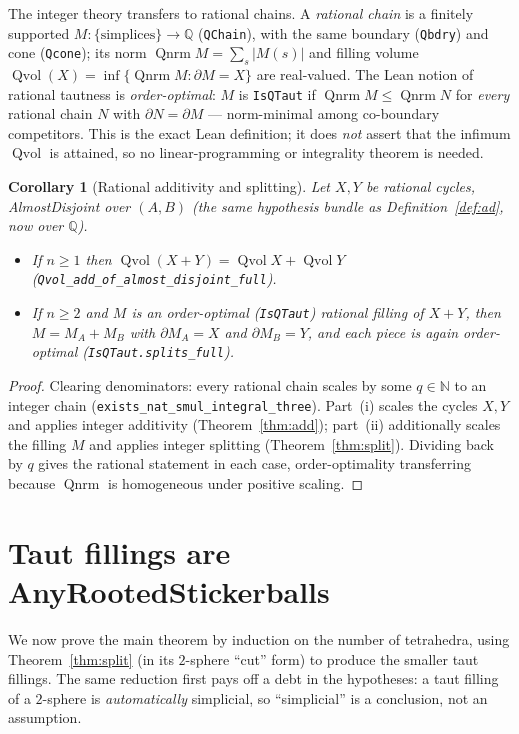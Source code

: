 \documentclass[11pt]{article}
\theoremstyle{plain}
\newtheorem{corollary}[theorem]{Corollary}
\theoremstyle{definition}
\theoremstyle{remark}
\newcommand{\Qvol}{\operatorname{Qvol}}
\newcommand{\Qnrm}{\operatorname{Qnrm}}
\newcommand{\bd}{\partial}
\newcommand{\Q}{\mathbb{Q}}
\newcommand{\code}[1]{\texttt{#1}}
\newcommand{\card}[1]{\lvert #1\rvert}
\begin{document}
The integer theory transfers to rational chains. A \emph{rational chain} is a finitely supported
$M\colon\{\text{simplices}\}\to\Q$ (\code{QChain}), with the same boundary (\code{Qbdry}) and
cone (\code{Qcone}); its norm $\Qnrm M=\sum_s\card{M(s)}$ and filling volume
$\Qvol(X)=\inf\{\Qnrm M:\bd M=X\}$ are real-valued. The Lean notion of rational tautness is
\emph{order-optimal}: $M$ is \code{IsQTaut} if $\Qnrm M\le\Qnrm N$ for \emph{every} rational
chain $N$ with $\bd N=\bd M$ --- norm-minimal among co-boundary competitors. This is the exact
Lean definition; it does \emph{not} assert that the infimum $\Qvol$ is attained, so no
linear-programming or integrality theorem is needed.

\begin{corollary}[Rational additivity and splitting]\label{cor:rational}
Let $X,Y$ be rational cycles, AlmostDisjoint over $(A,B)$ (the same hypothesis bundle as
Definition~\ref{def:ad}, now over $\Q$).
\begin{itemize}
\item[\rm(i)] If $n\ge 1$ then $\Qvol(X+Y)=\Qvol X+\Qvol Y$
(\code{Qvol\_add\_of\_almost\_disjoint\_full}).
\item[\rm(ii)] If $n\ge 2$ and $M$ is an order-optimal (\code{IsQTaut}) rational filling of
$X+Y$, then $M=M_A+M_B$ with $\bd M_A=X$ and $\bd M_B=Y$, and each piece is again order-optimal
(\code{IsQTaut.splits\_full}).
\end{itemize}
\end{corollary}

\begin{proof}
Clearing denominators: every rational chain scales by some $q\in\mathbb N$ to an integer chain
(\code{exists\_nat\_smul\_integral\_three}). Part~(i) scales the cycles $X,Y$ and applies integer
additivity (Theorem~\ref{thm:add}); part~(ii) additionally scales the filling $M$ and applies
integer splitting (Theorem~\ref{thm:split}). Dividing back by $q$ gives the rational statement in
each case, order-optimality transferring because $\Qnrm$ is homogeneous under positive scaling.
\end{proof}

\section{Taut fillings are AnyRootedStickerballs}\label{sec:main}

We now prove the main theorem by induction on the number of tetrahedra, using
Theorem~\ref{thm:split} (in its $2$-sphere ``cut'' form) to produce the smaller taut
fillings. The same reduction first pays off a debt in the hypotheses: a taut filling of a
$2$-sphere is \emph{automatically} simplicial, so ``simplicial'' is a conclusion, not an
assumption.
\end{document}

